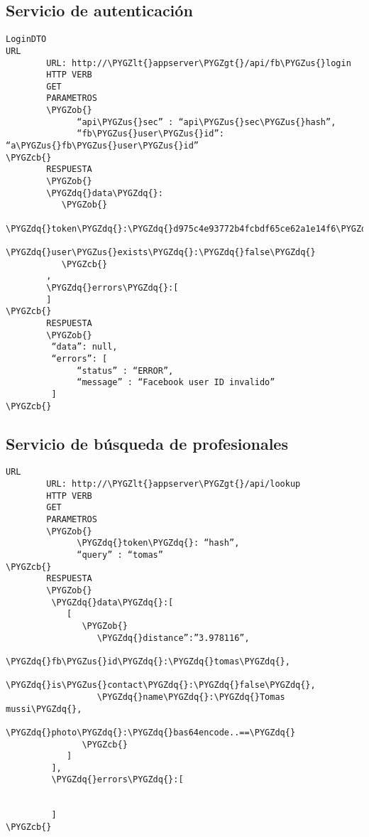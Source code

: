 \documentclass[a4paper,10pt,spanish]{sphinxmanual}
\def\PYGZus{\char`\_}
\def\PYGZob{\char`\{}
\def\PYGZcb{\char`\}}
\def\PYGZlt{\char`\<}
\def\PYGZgt{\char`\>}
\def\PYGZdq{\char`\"}
\begin{document}
\subsection{Servicio de autenticación}
\label{apiRest:servicio-de-autenticacion}
\begin{Verbatim}[commandchars=\\\{\}]
LoginDTO
URL
        URL: http://\PYGZlt{}appserver\PYGZgt{}/api/fb\PYGZus{}login
        HTTP VERB
        GET
        PARAMETROS
        \PYGZob{}
              “api\PYGZus{}sec” : “api\PYGZus{}sec\PYGZus{}hash”,
              “fb\PYGZus{}user\PYGZus{}id”: “a\PYGZus{}fb\PYGZus{}user\PYGZus{}id”
\PYGZcb{}
        RESPUESTA
        \PYGZob{}
        \PYGZdq{}data\PYGZdq{}:
           \PYGZob{}
              \PYGZdq{}token\PYGZdq{}:\PYGZdq{}d975c4e93772b4fcbdf65ce62a1e14f6\PYGZdq{},
              \PYGZdq{}user\PYGZus{}exists\PYGZdq{}:\PYGZdq{}false\PYGZdq{}
           \PYGZcb{}
        ,
        \PYGZdq{}errors\PYGZdq{}:[
        ]
\PYGZcb{}
        RESPUESTA
        \PYGZob{}
         “data”: null,
         “errors”: [
              “status” : “ERROR”,
              “message” : “Facebook user ID invalido”
         ]
\PYGZcb{}
\end{Verbatim}


\subsection{Servicio de búsqueda de profesionales}
\label{apiRest:servicio-de-busqueda-de-profesionales}
\begin{Verbatim}[commandchars=\\\{\}]
URL
        URL: http://\PYGZlt{}appserver\PYGZgt{}/api/lookup
        HTTP VERB
        GET
        PARAMETROS
        \PYGZob{}
              \PYGZdq{}token\PYGZdq{}: “hash”,
              “query” : “tomas”
\PYGZcb{}
        RESPUESTA
        \PYGZob{}
         \PYGZdq{}data\PYGZdq{}:[
            [
               \PYGZob{}
                  \PYGZdq{}distance”:”3.978116”,
                  \PYGZdq{}fb\PYGZus{}id\PYGZdq{}:\PYGZdq{}tomas\PYGZdq{},
                  \PYGZdq{}is\PYGZus{}contact\PYGZdq{}:\PYGZdq{}false\PYGZdq{},
                  \PYGZdq{}name\PYGZdq{}:\PYGZdq{}Tomas mussi\PYGZdq{},
                  \PYGZdq{}photo\PYGZdq{}:\PYGZdq{}bas64encode..==\PYGZdq{}
               \PYGZcb{}
            ]
         ],
         \PYGZdq{}errors\PYGZdq{}:[


         ]
\PYGZcb{}
\end{Verbatim}
\end{document}
